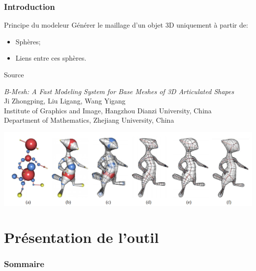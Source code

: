 \documentclass[9pt]{beamer}
\begin{document}
\begin{frame}
	\frametitle{Introduction}
	\begin{block}{Principe du modeleur}
		Générer le maillage d'un objet 3D uniquement à partir de:
		\begin{itemize}
			\item Sphères;
			\item Liens entre ces sphères.
		\end{itemize}
	\end{block}
	
	\begin{block}{Source}
		\begin{center}
			\textit{B-Mesh: A Fast Modeling System for Base Meshes of 3D Articulated Shapes} \\
			Ji Zhongping, Liu Ligang, Wang Yigang \\ 
			
			Institute of Graphics and Image, Hangzhou Dianzi University, China \\
			Department of Mathematics, Zhejiang University, China
		\end{center}
	\end{block}
	
	\begin{center}
		\includegraphics[scale=0.2]{images/bmesh.jpg}
	\end{center}
\end{frame}


\section{Présentation de l'outil}

\begin{frame}
	\frametitle{Sommaire}
	\tableofcontents[currentsection]
\end{frame}
\end{document}

